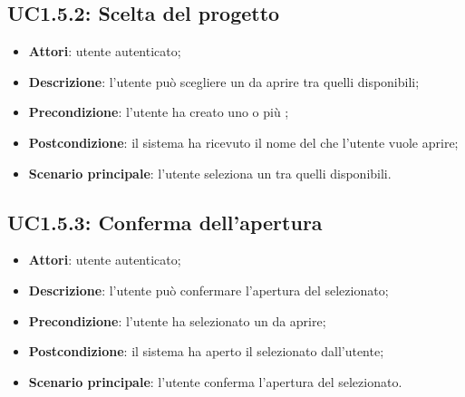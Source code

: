 \subsection{UC1.5.2: Scelta del progetto}
\label{UC1.5.2}
\begin{itemize}
\item \textbf{Attori}: utente autenticato;
\item \textbf{Descrizione}: l'utente può scegliere un  da aprire tra quelli disponibili;
\item \textbf{Precondizione}: l'utente ha creato uno o più ;
\item \textbf{Postcondizione}: il sistema ha ricevuto il nome del  che l'utente vuole aprire;
\item \textbf{Scenario principale}:
l'utente seleziona un  tra quelli disponibili.
\end{itemize}
\subsection{UC1.5.3: Conferma dell'apertura}
\label{UC1.5.3}
\begin{itemize}
\item \textbf{Attori}: utente autenticato;
\item \textbf{Descrizione}: l'utente può confermare l'apertura del  selezionato;
\item \textbf{Precondizione}: l'utente ha selezionato un  da aprire;
\item \textbf{Postcondizione}: il sistema ha aperto il  selezionato dall'utente;
\item \textbf{Scenario principale}:
l'utente conferma l'apertura del  selezionato.
\end{itemize}
